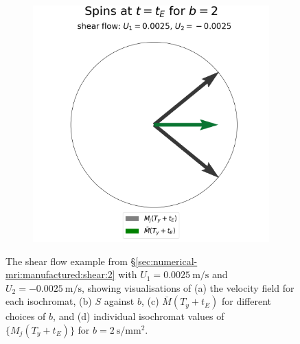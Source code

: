 \begin{figure}
\begin{subfigure}{0.4\textwidth}
                        \caption{}
                        \label{fig:mri-shear-2:b}
                    \end{subfigure}
                    \begin{subfigure}{0.4\textwidth}
                        \centering
                        \includegraphics[width=\textwidth]{diagrams/results-mri/simple-tests/mri-spins_avg_2D_shear_test_2.png}
                        \caption{}
                        \label{fig:mri-shear-2:spins}
                    \end{subfigure}
                    \caption{The shear flow example from \S\ref{sec:numerical-mri:manufactured:shear:2} with $U_1 = \qty{0.0025}{\metre\per\second}$ and $U_2 = \qty{-0.0025}{\metre\per\second}$, showing visualisations of (a) the velocity field for each isochromat, (b) $S$ against $b$, (c) $\bar{M}(T_y + t_E)$ for different choices of $b$, and (d) individual isochromat values of $\{ M_j(T_y + t_E) \}$ for $b=\qty{2}{\second\per\milli\metre^2}$.}
                    \label{fig:mri-shear-2}
                \end{figure}

